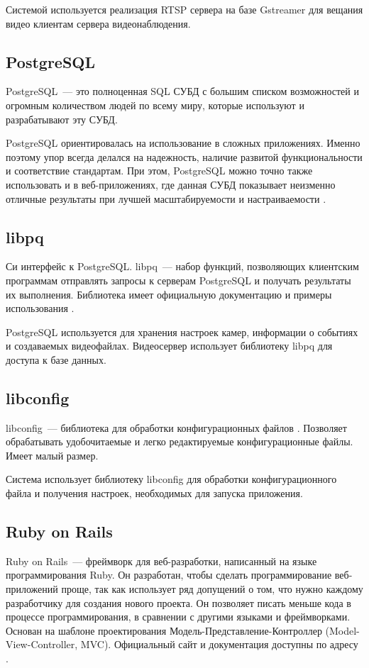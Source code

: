 Системой используется реализация RTSP сервера \cite{gst_rtsp_server} на базе Gstreamer для вещания видео клиентам сервера
видеонаблюдения.

\subsection{PostgreSQL}
PostgreSQL~--- это полноценная SQL СУБД с большим списком возможностей и огромным количеством
людей по всему миру, которые используют и разрабатывают эту СУБД.

PostgreSQL ориентировалась на использование в сложных приложениях. Именно поэтому упор всегда делался
на надежность, наличие развитой функциональности и соответствие стандартам. При этом, PostgreSQL
можно точно также использовать и в веб-приложениях, где данная СУБД показывает неизменно отличные
результаты при лучшей масштабируемости и настраиваемости \cite{about_pgsql}.

\subsection{libpq}
Си интерфейс к PostgreSQL. libpq~--- набор функций, позволяющих клиентским программам
отправлять запросы к серверам PostgreSQL и получать результаты их выполнения.
Библиотека имеет официальную документацию и примеры использования \cite{libpq_doc}.

PostgreSQL используется для хранения настроек камер, информации о событиях и создаваемых видеофайлах.
Видеосервер использует библиотеку libpq для доступа к базе данных.

\subsection{libconfig}
libconfig~--- библиотека для обработки конфигурационных файлов \cite{libconfig_doc}.
Позволяет обрабатывать удобочитаемые и легко редактируемые конфигурационные файлы.
Имеет малый размер.

Система использует библиотеку libconfig для обработки конфигурационного файла и получения настроек,
необходимых для запуска приложения.

\subsection{Ruby on Rails}
Ruby on Rails~--- фреймворк для веб-разработки, написанный на языке программирования Ruby.
Он разработан, чтобы сделать программирование веб-приложений проще, так как использует ряд допущений
о том, что нужно каждому разработчику для создания нового проекта. Он позволяет писать меньше
кода в процессе программирования, в сравнении с другими языками и фреймворками. Основан на
шаблоне проектирования Модель-Представление-Контроллер (Model-View-Controller, MVC).
Официальный сайт и документация доступны по адресу \cite{ror}.


